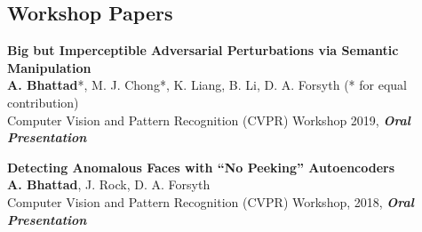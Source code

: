 \documentclass[margin,line]{res}
\begin{document}
\begin{resume}
\section{\sc \large Workshop Papers}
\renewcommand*{\labelenumi}{\theenumi.}
\begin{etaremune}[start=2, leftmargin=15pt]
\item {\bf Big but Imperceptible Adversarial Perturbations via Semantic Manipulation}\\
{{\bf A. Bhattad}*, M. J. Chong*, K. Liang, B. Li, D. A. Forsyth} \hfill{(* for equal contribution)} \\
Computer Vision and Pattern Recognition (CVPR) Workshop 2019, {\bf \emph{Oral Presentation}} 
\item {\bf Detecting Anomalous Faces with ``No Peeking'' Autoencoders}\\
{{\bf A. Bhattad}, J. Rock, D. A. Forsyth}\\ 
{Computer Vision and Pattern Recognition (CVPR) Workshop, 2018, {\bf \emph {Oral Presentation}}}
\end{etaremune}


\end{resume}
\end{document}
